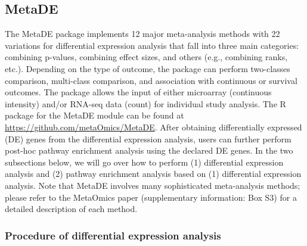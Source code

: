 \subsection{MetaDE}

The MetaDE package implements 12 major meta-analysis methods with 22 variations for differential expression analysis that fall into three main categories: combining p-values, combining effect sizes, 
and others (e.g., combining ranks, etc.). Depending on the type of outcome, the package can perform two-classes comparison, multi-class comparison, and association with continuous or survival outcomes. The package allows the input of either microarray (continuous intensity) and/or RNA-seq data (count) for individual study analysis. 
The R package for the MetaDE module can be found at \url{https://github.com/metaOmics/MetaDE}.
After obtaining differentially expressed (DE) genes from the differential expression analysis, 
users can further perform post-hoc pathway enrichment analysis using the declared DE genes.
In the two subsections below, 
we will go over how to perform (1) differential expression analysis and (2) pathway enrichment analysis based on (1) differential expression analysis.
Note that 
MetaDE involves many sophisticated meta-analysis methods; please refer to the MetaOmics paper (supplementary information: Box S3) for a detailed description of each method. 

\subsubsection{Procedure of differential expression analysis}

